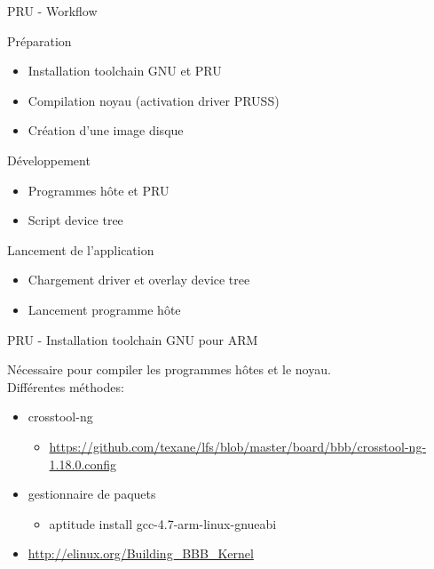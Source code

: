 \documentclass{beamer}
\begin{document}
\begin{frame}{PRU - Workflow}

  \begin{small}

    Pr\'eparation
    \begin{itemize}
    \item Installation toolchain GNU et PRU
    \item Compilation noyau (activation driver PRUSS)
    \item Cr\'eation d'une image disque
    \end{itemize}

    D\'eveloppement
    \begin{itemize}
    \item Programmes h\^ote et PRU
    \item Script device tree
    \end{itemize}

    Lancement de l'application
    \begin{itemize}
    \item Chargement driver et overlay device tree
    \item Lancement programme h\^ote
    \end{itemize}

  \end{small}

\end{frame}


\begin{frame}{PRU - Installation toolchain GNU pour ARM}
  \begin{small}
    N\'ecessaire pour compiler les programmes h\^otes et le noyau.\\
    Diff\'erentes m\'ethodes:
    \begin{itemize}
    \item crosstool-ng
      \begin{itemize}
      \item \begin{tiny} \url{https://github.com/texane/lfs/blob/master/board/bbb/crosstool-ng-1.18.0.config} \end{tiny}
      \end{itemize}
    \item gestionnaire de paquets
      \begin{itemize}
      \item \begin{tiny} aptitude install gcc-4.7-arm-linux-gnueabi \end{tiny}
      \end{itemize}
    \item \url{http://elinux.org/Building_BBB_Kernel}
    \end{itemize}
  \end{small}
\end{frame}
\end{document}
